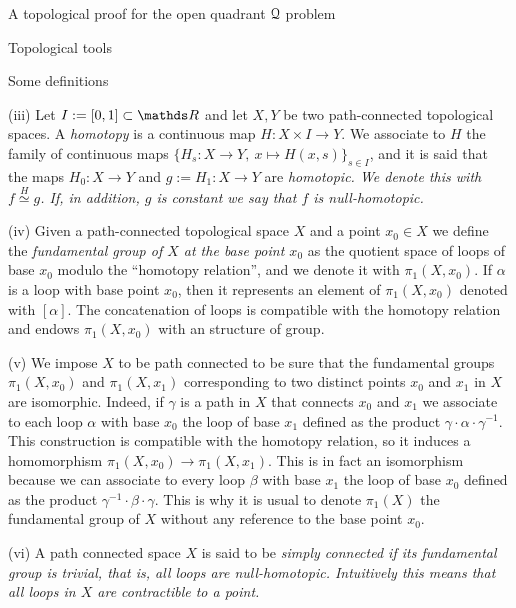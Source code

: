 \documentclass[11pt, a4paper, english, twoside, notitlepage, openright]{report}
\begin{document}
\begin{chapter}{A topological proof for the open quadrant $\mathcal{Q}$ problem}
\begin{section}{Topological tools}
\begin{subsection}{Some definitions}
\begin{definitions}
\vspace{1mm}

(iii) Let $I:=[0,1]\subset\R$ and let $X,Y$ be two path-connected topological spaces. A \emph{homotopy} is a continuous map $H: X\times I\longrightarrow Y$. We associate to $H$ the family of continuous maps $\{H_s:X\to Y,\ x\mapsto H(x,s)\}_{s\in I}$, and it is said that the maps $H_0:X\to Y$ and $g:=H_1:X\to Y$ are \em homotopic. \em We denote this with $f\overset{H}{\simeq}g$. If, in addition, $g$ is constant we say that $f$ is \emph{null-homotopic}.

\vspace{1mm} 

(iv) Given a path-connected topological space $X$ and a point $x_0\in X$ we define the \emph{fundamental group of $X$ at the base point $x_0$} as the quotient space of loops of base $x_0$ modulo the ``homotopy relation'', and we denote it with $\pi_1(X,x_0)$. If $\alpha$ is a loop with base point $x_0$, then it represents an element of $\pi_1(X,x_0)$ denoted with $[\alpha]$. The concatenation of loops is compatible with the homotopy relation and endows $\pi_1(X,x_0)$ with an structure of group.

\vspace{1mm}

(v) We impose $X$ to be path connected to be sure that the fundamental groups $\pi_1(X,x_0)$ and $\pi_1(X,x_1)$ corresponding to two distinct points $x_0$ and $x_1$ in $X$ are isomorphic. Indeed, if $\gamma$ is a path in $X$ that connects $x_0$ and $x_1$ we associate to each loop $\alpha$ with base $x_0$ the loop of base $x_1$ defined as the product $\gamma\cdot\alpha\cdot\gamma^{-1}$. This construction is compatible with the homotopy relation, so it induces a homomorphism $\pi_1(X,x_0)\to\pi_1(X,x_1)$. This is in fact an isomorphism because we can associate to every loop $\beta$ with base $x_1$ the loop of base $x_0$ defined as the product $\gamma^{-1}\cdot\beta\cdot\gamma$. This is why it is usual to denote $\pi_1(X)$ the fundamental group of $X$ without any reference to the base point $x_0$. 
\end{definitions}

\vspace{1mm}

(vi) A path connected space $X$ is said to be \em simply connected \em if its fundamental group is trivial, that is, all loops are null-homotopic. Intuitively this means that all loops in $X$ are contractible to a point.

\vspace{1mm}


\end{subsection}
\end{section}
\end{chapter}
\end{document}
